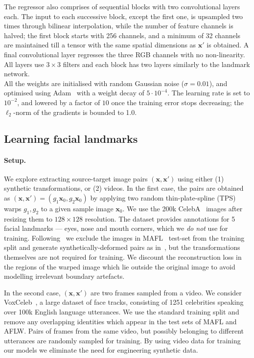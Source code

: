 \documentclass{article}
\newcommand{\bx}{\mathbf{x}}
\begin{document}
The regressor also comprises of sequential blocks with two convolutional layers each. The input to each successive block, except the first one, is upsampled two times through bilinear interpolation, while the number of feature channels is halved; the first block starts with 256 channels, and a minimum of 32 channels are maintained till a tensor with the same spatial dimensions as $\bx'$ is obtained. A final convolutional layer regresses the three RGB channels with no non-linearity. All layers use $3{\times}3$ filters and each block has two layers similarly to the landmark network.\\
All the weights are initialised with random Gaussian noise ($\sigma = 0.01$), and optimised using Adam~\citep{Kingma14} with a weight decay of $5\cdot10^{-4}$. The learning rate is set to $10^{-2}$, and lowered by a factor of $10$ once the training error stops decreasing; the $\ell_2$-norm of the gradients is bounded to 1.0.


\subsection{Learning facial landmarks}\label{s:facialkpt}\paragraph{Setup.}


We explore extracting source-target image pairs $(\bx,\bx')$ using either (1) synthetic transformations, or (2) videos. In the first case, the pairs are obtained as $(\bx, \bx')=(g_1\bx_0, g_2\bx_0)$ by applying two random thin-plate-spline (TPS)~\citep{duchon1977splines,wahba1990spline} warps $g_1,g_2$ to a given sample image $\bx_0$. We use the 200k CelebA~\citep{liu2015faceattributes} images after resizing them to $128{\times}128$ resolution. The dataset provides annotations for 5 facial landmarks --- eyes, nose and mouth corners, which we \emph{do not} use for training. Following~\cite{thewlis17unsupervised} we exclude the images in MAFL~\citep{Zhang2016} test-set from the training split and generate synthetically-deformed pairs as in~\citep{thewlis17unsupervised,zhang2018unsupervised}, but the transformations themselves are not required for training. We discount the reconstruction loss in the regions of  the warped image which lie outside the original image to avoid modelling irrelevant boundary artefacts.


In the second case, $(\bx,\bx')$ are two frames sampled from a video. We consider VoxCeleb~\citep{Nagrani17}, a large dataset of face tracks, consisting of 1251 celebrities speaking over 100k English language utterances. We use the standard training split and remove any overlapping identities which appear in the test sets of MAFL and AFLW. Pairs of frames from the same video, but possibly belonging to different utterances are randomly sampled for training. By using video data for training our models we eliminate the need for engineering synthetic data.
\end{document}
